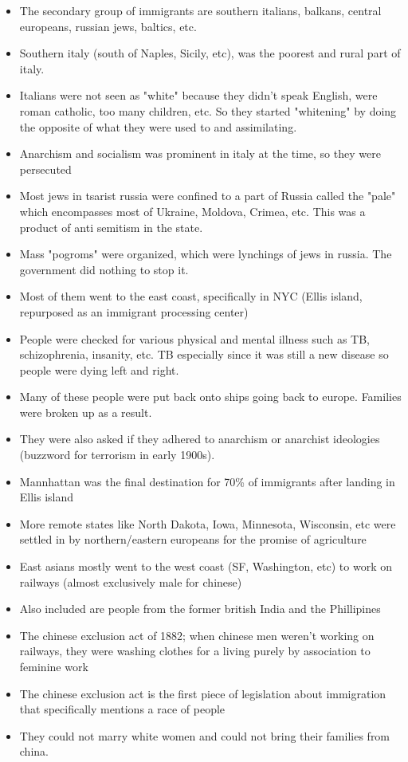 \documentclass[12pt]{book}
\begin{document}
\begin{itemize}
  \item The secondary group of immigrants are southern italians, balkans, central europeans, russian jews, baltics, etc.
  \item Southern italy (south of Naples, Sicily, etc), was the poorest and rural part of italy. \item Italians were not seen as "white" because they didn't speak English, were roman catholic, too many children, etc. So they started "whitening" by doing the opposite of what they were used to and assimilating.
  \item Anarchism and socialism was prominent in italy at the time, so they were persecuted
  \item Most jews in tsarist russia were confined to a part of Russia called the "pale" which encompasses most of Ukraine, Moldova, Crimea, etc. This was a product of anti semitism in the state.
  \item Mass "pogroms" were organized, which were lynchings of jews in russia. The government did nothing to stop it.
  \item Most of them went to the east coast, specifically in NYC (Ellis island, repurposed as an immigrant processing center)
  \item People were checked for various physical and mental illness such as TB, schizophrenia, insanity, etc. TB especially since it was still a new disease so people were dying left and right.
  \item Many of these people were put back onto ships going back to europe. Families were broken up as a result.
  \item They were also asked if they adhered to anarchism or anarchist ideologies (buzzword for terrorism in early 1900s). 
  \item Mannhattan was the final destination for 70\% of immigrants after landing in Ellis island
  \item More remote states like North Dakota, Iowa, Minnesota, Wisconsin, etc were settled in by northern/eastern europeans for the promise of agriculture
  \item East asians mostly went to the west coast (SF, Washington, etc) to work on railways (almost exclusively male for chinese)
  \item Also included are people from the former british India and the Phillipines
  \item The chinese exclusion act of 1882; when chinese men weren't working on railways, they were washing clothes for a living purely by association to feminine work
  \item The chinese exclusion act is the first piece of legislation about immigration that specifically mentions a race of people
  \item They could not marry white women and could not bring their families from china.
\end{itemize}
\end{document}
